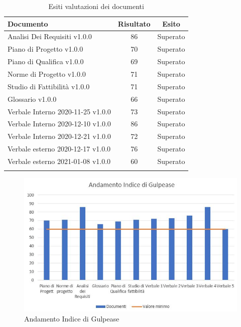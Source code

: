 \documentclass[../piano_di_qualifica.tex]{subfiles}
\begin{document}
\begin{center}
	\begin{longtable}{|l|c|c|}
		\hline
		\rowcolor{lightgray}
            \textbf{Documento} & \textbf{Risultato} &  \textbf{Esito} \\
            \hline 
            Analisi Dei Requisiti v1.0.0 & 86   & Superato \\
            \hline
            \hline 
            Piano di Progetto v1.0.0 & 70 & Superato \\
            \hline 
            Piano di Qualifica v1.0.0 & 69 & Superato \\
            \hline 
            Norme di Progetto v1.0.0 & 71 & Superato \\
            \hline 
            Studio di Fattibilità v1.0.0 & 71 & Superato \\
            \hline 
            Glossario v1.0.0 & 66 & Superato \\
            \hline 
            Verbale Interno 2020-11-25 v1.0.0 & 73 & Superato \\
            \hline 
            Verbale Interno 2020-12-10 v1.0.0 & 86 & Superato \\
            \hline 
            Verbale Interno 2020-12-21 v1.0.0 & 72 & Superato \\
            \hline 
            Verbale esterno 2020-12-17  v1.0.0 & 76 & Superato \\
            \hline
	    Verbale esterno 2021-01-08  v1.0.0 & 60 & Superato \\
            \hline
            \hline

\caption{Esiti valutazioni dei documenti}
\end{longtable}
\end{center}

\begin{figure}[H]
\centering
\includegraphics[width=12cm]{componenti/media_gul}
\caption{ Andamento Indice di Gulpease}
\end{figure}
\end{document}
